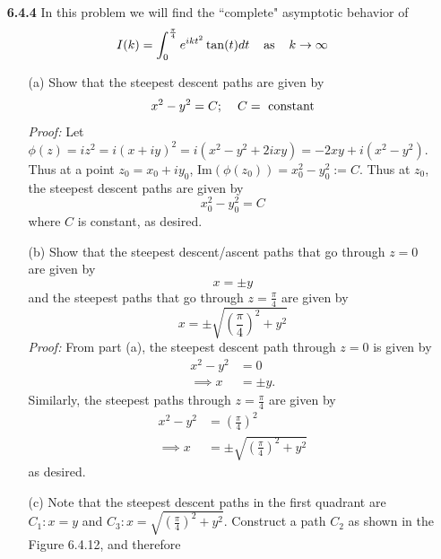 \documentclass{article}
\begin{document}
\begin{itemize}
    \pagebreak
    \item[\textbf{6.4.4}] In this problem we will find the ``complete" asymptotic behavior of 
    \[I(k) = \int_0^{\frac{\pi}{4}}e^{ikt^2}\tan(t)dt \hspace{0.4cm} \text{as} \hspace{0.4cm} k \to \infty\]
    \begin{itemize}
        \item[(a)] Show that the steepest descent paths are given by 
        \[x^2 - y^2 = C; \hspace{0.4cm} C = \text{ constant}\]
        \textit{Proof:} Let $\phi(z) = iz^2 = i(x + iy)^2 = i(x^2 - y^2 + 2ixy) = -2xy + i(x^2 - y^2)$. Thus at a point $z_0 = x_0 + iy_0$, $\text{Im}(\phi(z_0)) = x_0^2 - y_0^2 := C$. Thus at $z_0$, the steepest descent paths are given by
        \[x_0^2 - y_0^2 = C\]
        where $C$ is constant, as desired.
        \newline\newline

        \item[(b)] Show that the steepest descent/ascent paths that go through $z = 0$ are given by
        \[x = \pm y\]
        and the steepest paths that go through $z = \frac{\pi}{4}$ are given by
        \[x = \pm \sqrt{\left(\frac{\pi}{4}\right)^2 + y^2}\]
        \textit{Proof:} From part (a), the steepest descent path through $z = 0$ is given by
        \begin{align*}
            x^2 - y^2 &= 0\\
            \implies x &= \pm y.
        \end{align*}
        Similarly, the steepest paths through $z = \frac{\pi}{4}$ are given by
        \begin{align*}
            x^2 - y^2 &= \left(\frac{\pi}{4}\right)^2\\
            \implies x &= \pm \sqrt{\left(\frac{\pi}{4}\right)^2 + y^2}
        \end{align*}
        as desired.
        \newline\newline

        \item[(c)] Note that the steepest descent paths in the first quadrant are $C_1 : x = y$ and $C_3 : x = \sqrt{\left(\frac{\pi}{4}\right)^2 + y^2}$. Construct a path $C_2$ as shown in the Figure 6.4.12, and therefore


\end{itemize}
\end{itemize}
\end{document}
